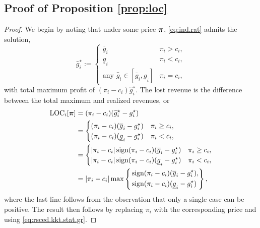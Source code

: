 \subsection{Proof of Proposition \ref{prop:loc}}
\label{app:proof.prop.loc}
\begin{proof}
  We begin by noting that under some price ${\bm{\pi}}$, \eqref{eq:ind.rat} admits the solution,
  \begin{equation}
      \hat{g}_i^\star := \begin{cases}
        \overline{g}_i & \pi_i > c_i, \\
        \underline{g}_i & \pi_i < c_i, \\
        \text{any } \hat{g}_i \in [\overline{g}_i, \underline{g}_i] & \pi_i = c_i,
      \end{cases}
  \end{equation}
  with total maximum profit of $(\pi_i - c_i) \hat{g}_i^\star$. The lost revenue is the difference between the total maximum and realized revenues, or
  \begin{equation}
  \begin{aligned}
      {\rm LOC}_i[{\bm{\pi}}] &= (\pi_i - c_i) (\widehat{g}_i^\star - g_i^\star) \\
      &= \begin{cases}
        (\pi_i - c_i) (\overline{g}_i - g_i^\star) & \pi_i \ge c_i, \\
        (\pi_i - c_i) (\underline{g}_i - g_i^\star) & \pi_i < c_i,
      \end{cases} \\
      &= \begin{cases}
        | \pi_i - c_i | \operatorname{sign}(\pi_i - c_i) (\overline{g}_i - g_i^\star) & \pi_i \ge c_i, \\
        | \pi_i - c_i | \operatorname{sign}(\pi_i - c_i) (\underline{g}_i - g_i^\star) & \pi_i < c_i,
      \end{cases} \\
      &= | \pi_i - c_i | \max\left\{ \begin{aligned} &\operatorname{sign}(\pi_i - c_i) (\overline{g}_i - g_i^\star), \\ &\operatorname{sign}(\pi_i - c_i) (\underline{g}_i - g_i^\star) \end{aligned} \right\},
    \label{eq:loc.ind}
  \end{aligned}
  \end{equation}
  where the last line follows from the observation that only a single case can be positive.
  The result then follows by replacing $\pi_i$ with the corresponding price and using \eqref{eq:rsced.kkt.stat.gr}.
\end{proof}
\hfil
\fi



